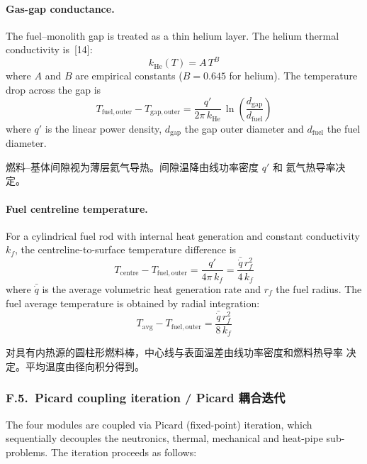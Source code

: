 \documentclass[11pt,a4paper]{article}
\begin{document}
\paragraph{Gas-gap conductance.}
The fuel--monolith gap is treated as a thin helium layer. The helium
thermal conductivity is~[14]:
\begin{equation}
k_{\mathrm{He}}(T) = A\,T^{B}
\end{equation}
where $A$ and $B$ are empirical constants ($B = 0.645$ for helium).
The temperature drop across the gap is
\begin{equation}
T_{\mathrm{fuel,outer}} - T_{\mathrm{gap,outer}}
= \frac{q'}{2\pi\,k_{\mathrm{He}}}\,
  \ln\!\left(\frac{d_{\mathrm{gap}}}{d_{\mathrm{fuel}}}\right)
\end{equation}
where $q'$ is the linear power density, $d_{\mathrm{gap}}$ the gap
outer diameter and $d_{\mathrm{fuel}}$ the fuel diameter.

燃料--基体间隙视为薄层氦气导热。间隙温降由线功率密度 $q'$ 和
氦气热导率决定。

\paragraph{Fuel centreline temperature.}
For a cylindrical fuel rod with internal heat generation and constant
conductivity $k_f$, the centreline-to-surface temperature difference is
\begin{equation}
T_{\mathrm{centre}} - T_{\mathrm{fuel,outer}}
= \frac{q'}{4\pi\,k_f}
= \frac{\bar{\dot{q}}\,r_f^2}{4\,k_f}
\end{equation}
where $\bar{\dot{q}}$ is the average volumetric heat generation rate
and $r_f$ the fuel radius. The fuel average temperature is obtained by
radial integration:
\begin{equation}
T_{\mathrm{avg}} - T_{\mathrm{fuel,outer}}
= \frac{\bar{\dot{q}}\,r_f^2}{8\,k_f}
\end{equation}

对具有内热源的圆柱形燃料棒，中心线与表面温差由线功率密度和燃料热导率
决定。平均温度由径向积分得到。


\subsubsection*{F.5.~Picard coupling iteration / Picard 耦合迭代}

The four modules are coupled via Picard (fixed-point) iteration, which
sequentially decouples the neutronics, thermal, mechanical and heat-pipe
sub-problems. The iteration proceeds as follows:
\end{document}
